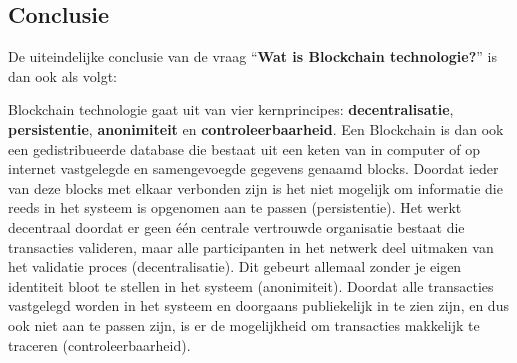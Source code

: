 \subsection{Conclusie}

De uiteindelijke conclusie van de vraag ``\textbf{Wat is Blockchain technologie?}'' is dan ook als volgt:

Blockchain technologie gaat uit van vier kernprincipes: \textbf{decentralisatie}, \textbf{persistentie}, \textbf{anonimiteit} en \textbf{controleerbaarheid}. Een Blockchain is dan ook een gedistribueerde database die bestaat uit een keten van in computer of op internet vastgelegde en samengevoegde gegevens genaamd blocks. Doordat ieder van deze blocks met elkaar verbonden zijn is het niet mogelijk om informatie die reeds in het systeem is opgenomen aan te passen (persistentie). Het werkt decentraal doordat er geen één centrale vertrouwde organisatie bestaat die transacties valideren, maar alle participanten in het netwerk deel uitmaken van het validatie proces (decentralisatie). Dit gebeurt allemaal zonder je eigen identiteit bloot te stellen in het systeem (anonimiteit). Doordat alle transacties vastgelegd worden in het systeem en doorgaans publiekelijk in te zien zijn, en dus ook niet aan te passen zijn, is er de mogelijkheid om transacties makkelijk te traceren (controleerbaarheid).